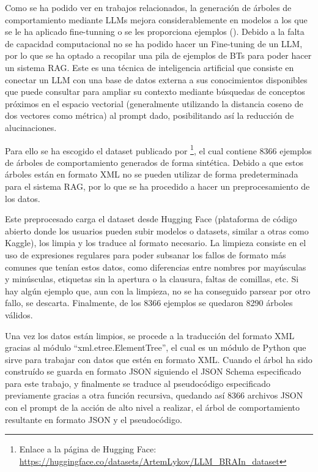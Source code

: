 Como se ha podido ver en trabajos relacionados, la generación de árboles de comportamiento mediante LLMs mejora considerablemente en modelos a los que se le ha aplicado fine-tunning o se les proporciona ejemplos (\cite{llmbrain}).
Debido a la falta de capacidad computacional no se ha podido hacer un Fine-tuning de un LLM, por lo que se ha optado a recopilar una pila de ejemplos de BTs para poder hacer un sistema RAG.
Este es una técnica de inteligencia artificial que consiste en conectar un LLM con una base de datos externa a sus conocimientos disponibles que puede consultar para ampliar su contexto mediante búsquedas de conceptos próximos en el espacio vectorial (generalmente utilizando la distancia coseno de dos vectores como métrica) al prompt dado, posibilitando así la reducción de alucinaciones.

Para ello se ha escogido el dataset publicado por \cite{llmbrain}\footnote{Enlace a la página de Hugging Face: \url{https://huggingface.co/datasets/ArtemLykov/LLM_BRAIn_dataset}}, el cual contiene 8366 ejemplos de árboles de comportamiento generados de forma sintética.
Debido a que estos árboles están en formato XML no se pueden utilizar de forma predeterminada para el sistema RAG, por lo que se ha procedido a hacer un preprocesamiento de los datos.

Este preprocesado carga el dataset desde Hugging Face (plataforma de código abierto donde los usuarios pueden subir modelos o datasets, similar a otras como Kaggle), los limpia y los traduce al formato necesario.
La limpieza consiste en el uso de expresiones regulares para poder subsanar los fallos de formato más comunes que tenían estos datos, como diferencias entre nombres por mayúsculas y minúsculas, etiquetas sin la apertura o la clausura, faltas de comillas, etc.
Si hay algún ejemplo que, aun con la limpieza, no se ha conseguido parsear por otro fallo, se descarta.
Finalmente, de los 8366 ejemplos se quedaron 8290 árboles válidos.

Una vez los datos están limpios, se procede a la traducción del formato XML gracias al módulo ``xml.etree.ElementTree'', el cual es un módulo de Python que sirve para trabajar con datos que estén en formato XML.
Cuando el árbol ha sido construído se guarda en formato JSON siguiendo el JSON Schema especificado para este trabajo, y finalmente se traduce al pseudocódigo especificado previamente gracias a otra función recursiva, quedando así 8366 archivos JSON con el prompt de la acción de alto nivel a realizar, el árbol de comportamiento resultante en formato JSON y el pseudocódigo.

